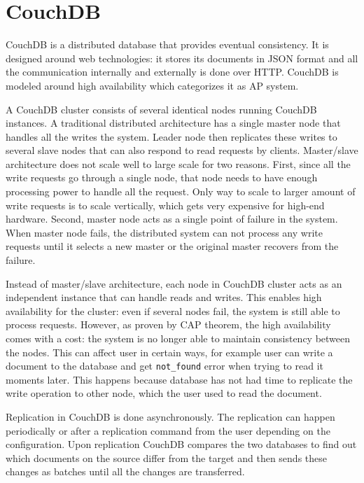 \section{CouchDB}

CouchDB is a distributed database that provides eventual
consistency\cite{anderson2010couchdb}. It is designed around web technologies:
it stores its documents in JSON format and all the communication internally and
externally is done over HTTP\@. CouchDB is modeled around high availability
which categorizes it as AP system.

A CouchDB cluster consists of several identical nodes running CouchDB instances.
A traditional distributed architecture has a single master node that handles all
the writes the system. Leader node then replicates these writes to several
slave nodes that can also respond to read requests by clients. Master/slave
architecture does not scale well to large scale for two reasons. First, since
all the write requests go through a single node, that node needs to have enough
processing power to handle all the request. Only way to scale to larger amount
of write requests is to scale vertically, which gets very expensive for high-end
hardware. Second, master node acts as a single point of failure in the system.
When master node fails, the distributed system can not process any write
requests until it selects a new master or the original master recovers from the
failure.

Instead of master/slave architecture, each node in CouchDB cluster acts as an
independent instance that can handle reads and writes. This enables high
availability for the cluster: even if several nodes fail, the system is still
able to process requests. However, as proven by CAP theorem, the high
availability comes with a cost: the system is no longer able to maintain
consistency between the nodes. This can affect user in certain ways, for example
user can write a document to the database and get \texttt{not\_found} error when
trying to read it moments later. This happens because database has not had time
to replicate the write operation to other node, which the user used to read the
document.

Replication in CouchDB is done asynchronously. The replication can happen
periodically or after a replication command from the user depending on the
configuration. Upon replication CouchDB compares the two databases to find out
which documents on the source differ from the target and then sends these
changes as batches until all the changes are transferred.


